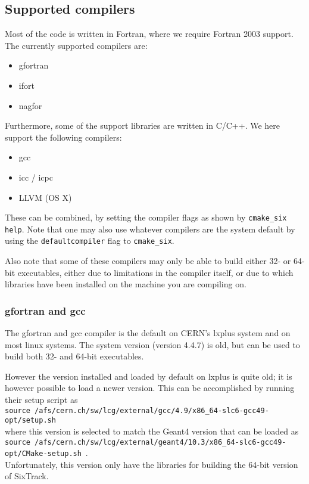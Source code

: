 \documentclass[english]{article}
\begin{document}
\subsection{Supported compilers}
Most of the code is written in Fortran, where we require Fortran 2003 support.
The currently supported compilers are:
\begin{itemize}
\item gfortran
\item ifort
\item nagfor
\end{itemize}
Furthermore, some of the support libraries are written in C/C++.
We here support the following compilers:
\begin{itemize}
\item gcc
\item icc / icpc
\item LLVM (OS X)
\end{itemize}
These can be combined, by setting the compiler flags as shown by \texttt{cmake\_six help}.
Note that one may also use whatever compilers are the system default by using the \texttt{defaultcompiler} flag to \texttt{cmake\_six}.

Also note that some of these compilers may only be able to build either 32- or 64-bit executables, either due to limitations in the compiler itself, or due to which libraries have been installed on the machine you are compiling on.

\subsubsection{gfortran and gcc}
The gfortran and gcc compiler is the default on CERN's lxplus system and on most linux systems.
The system version (version 4.4.7) is old, but can be used to build both 32- and 64-bit executables.

However the version installed and loaded by default on lxplus is quite old; it is however possible to load a newer version.
This can be accomplished by running their setup script as\\
{\scriptsize
  \texttt{source /afs/cern.ch/sw/lcg/external/gcc/4.9/\-x86\_64\--slc6\--gcc49\--opt/\-setup.sh}\\
}
where this version is selected to match the Geant4 version that can be loaded as
{\scriptsize
  \texttt{source /afs/cern.ch/sw/lcg/external/geant4/10.3/x86\_64\--slc6\--gcc49\--opt/\-CMake-setup.sh}~.\\
}
Unfortunately, this version only have the libraries for building the 64-bit version of SixTrack.
\end{document}
